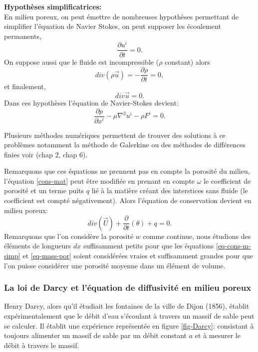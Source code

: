 \documentclass[a4paper,11pt]{article}
\numberwithin{equation}{section}
\begin{document}
\vspace{0.7cm}

\noindent \textbf{Hypothèses simplificatrices:}\\
En milieu poreux, on peut émettre de nombreuses hypothèses permettant de simplifier l'équation de Navier Stokes, on peut supposer les écoulement permanents,
\[\frac{\partial u^i}{\partial t}=0.\]
On suppose aussi que le fluide est incompressible ($\rho$ constant) alors
\[div(\rho \overrightarrow{u})=-\frac{\partial \rho}{\partial t}=0,\]
et finalement,
\[div \overrightarrow{u}=0.\]
Dans ces hypothèses l'équation de Navier-Stokes devient:
\begin{equation}
	\label{eq-cons-m-simp}
	\frac{\partial p}{\partial x^i}-\mu \nabla^2u^i-\rho F^i=0. 
\end{equation}

Plusieurs méthodes numériques permettent de trouver des solutions à ce problèmes notamment la méthode de Galerkine ou des méthodes de différences finies voir \cite{allaire2005analyse} (chap 2, chap 6). 

\vspace{7mm}

Remarquons que ces équations ne prennent pas en compte la porosité du milieu, l'équation \eqref{cons-mat} peut être modifiée en prenant en compte $\omega$ le coefficient de porosité et un terme puits $q$ lié à la matière créant des interstices sans fluide (le coefficient est compté négativement). Alors l'équation de conservation devient en milieu poreux:
\begin{equation}
	\label{eq-mass-por}
	div(\overrightarrow{U})+\frac{\partial}{\partial t}(\theta)+ q=0.
\end{equation}
Remarquons que l'on considère la porosité $w$ comme continue, nous étudions des éléments de longueurs $dx$ suffisamment petits pour que les équations \eqref{eq-cons-m-simp} et \eqref{eq-mass-por} soient considérées vraies et suffisamment grandes pour que l'on puisse considérer une porosité moyenne dans un élément de volume.

\subsubsection{La loi de Darcy et l'équation de diffusivité en milieu poreux}
\label{Darcy}
Henry Darcy, alors qu'il étudiait les fontaines de la ville de Dijon (1856), établit expérimentalement que le débit d'eau s'écoulant à travers un massif de sable peut se calculer. Il établit une expérience représentée en figure \ref{fig-Darcy}: consistant à toujours alimenter un massif de sable par un débit constant $a$ et à mesurer le débit à travers le massif.
\end{document}
